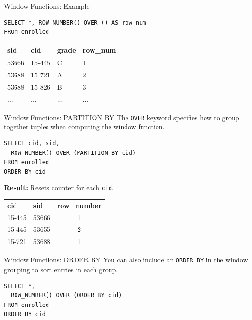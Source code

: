 \documentclass[aspectratio=169]{beamer}
\begin{document}
\begin{frame}[fragile]{Window Functions: Example}
    \begin{lstlisting}
SELECT *, ROW_NUMBER() OVER () AS row_num
FROM enrolled
    \end{lstlisting}
    
    \begin{tabular}{|l|l|l|l|}
    \hline
    sid & cid & grade & row\_num \\ \hline
    53666 & 15-445 & C & 1 \\ \hline
    53688 & 15-721 & A & 2 \\ \hline
    53688 & 15-826 & B & 3 \\ \hline
    ... & ... & ... & ... \\ \hline
    \end{tabular}
\end{frame}

\begin{frame}[fragile]{Window Functions: PARTITION BY}
    The \texttt{OVER} keyword specifies how to group together tuples when computing the window function.
    
    \begin{lstlisting}
SELECT cid, sid,
  ROW_NUMBER() OVER (PARTITION BY cid)
FROM enrolled
ORDER BY cid
    \end{lstlisting}
    
    \textbf{Result:} Resets counter for each \texttt{cid}.
    \begin{tabular}{llc}
    \textbf{cid} & \textbf{sid} & \textbf{row\_number} \\
    15-445 & 53666 & 1 \\
    15-445 & 53655 & 2 \\
    15-721 & 53688 & 1 \\
    \end{tabular}
\end{frame}

\begin{frame}[fragile]{Window Functions: ORDER BY}
    You can also include an \texttt{ORDER BY} in the window grouping to sort entries in each group.
    
    \begin{lstlisting}
SELECT *,
  ROW_NUMBER() OVER (ORDER BY cid)
FROM enrolled
ORDER BY cid
    \end{lstlisting}
\end{frame}
\end{document}
